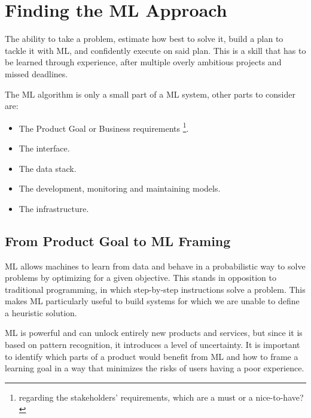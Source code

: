 \section{Finding the ML Approach}
The ability to take a problem, estimate how best to solve it, 
build a plan to tackle it with ML, and confidently execute on said
plan. This is a skill that has to be learned through experience,
after multiple overly ambitious projects and missed deadlines.

The ML algorithm is only a small part of a ML system, other parts to 
consider are:
\begin{itemize}
    \item The Product Goal or Business requirements
    \footnote{
        regarding the stakeholders' requirements, which are a must or a nice-to-have?
    }.
    \item The interface.
    \item The data stack.
    \item The development, monitoring and maintaining models.
    \item The infrastructure.
\end{itemize}





\subsection{From Product Goal to ML Framing}
ML allows machines to learn from data and behave in a probabilistic
way to solve problems by optimizing for a given objective. This
stands in opposition to traditional programming, in which
step-by-step instructions solve a problem. This makes ML
particularly useful to build systems for which we are unable to
define a heuristic solution.

ML is powerful and can unlock entirely new products and services,
but since it is based on pattern recognition, it introduces a
level of uncertainty. It is important to identify which parts
of a product would benefit from ML and how to frame a learning
goal in a way that minimizes the risks of users having a poor
experience.

